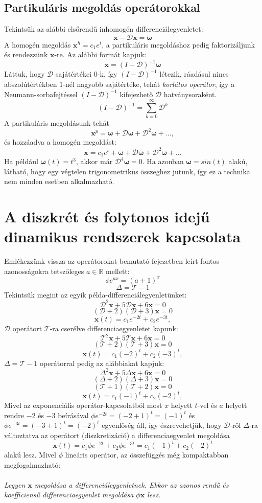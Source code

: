 \documentclass[14p]{article}
\begin{document}
\subsection{Partikuláris megoldás operátorokkal}
Tekintsük az alábbi elsőrendű inhomogén differenciálegyenletet:
\[
	\pmb{x} - \mathcal{D}\pmb{x} = \pmb{\omega}
\]
A homogén megoldás $\pmb{x}^h = c_1 e^{t}$, a partikuláris megoldáshoz pedig faktorizáljunk és rendezzünk $\pmb{x}$-re. Az alábbi formát kapjuk:
\[
	\pmb{x} = (I - \mathcal{D})^{-1}\pmb{\omega}
\]
Láttuk, hogy $\mathcal{D}$ sajátértékei 0-k, így $(I - \mathcal{D})^{-1}$ létezik, ráadásul nincs abszolútértékben $1$-nél nagyobb sajátértéke, tehát \emph{korlátos operátor}, így a Neumann-sorbafejtéssel $(I - \mathcal{D})^{-1}$ kifejezhető $\mathcal{D}$ hatványsoraként.
\[
	(I - \mathcal{D})^{-1} = \sum_{k=0}^{\infty}{\mathcal{D}^k}
\]
A partikuláris megoldásunk tehát
\[
	\pmb{x}^p = \pmb{\omega} + \mathcal{D}\pmb{\omega} + \mathcal{D}^2\pmb{\omega} + \dots,
\]
és hozzáadva a homogén megoldást:
\[
	\pmb{x} = c_1 e^{t} + \pmb{\omega} + \mathcal{D}\pmb{\omega} + \mathcal{D}^2\pmb{\omega} + \dots
\]
Ha például $\pmb{\omega}(t) = t^3$, akkor már $\mathcal{D}^4\pmb{\omega} = 0$. Ha azonban $\pmb{\omega} = sin(t)$ alakú, látható, hogy egy végtelen trigonometrikus összeghez jutunk, így ez a technika nem minden esetben alkalmazható.

\section{A diszkrét és folytonos idejű dinamikus rendszerek kapcsolata}
Emlékezzünk vissza az operátorokat bemutató fejezetben leírt fontos azonosságokra tetszőleges $a \in \mathbb{R}$ mellett:
\[
	\phi e^{ax} = (a+1)^x
\]
\[
	\Delta = \mathcal{T} - 1
\]
Tekintsük megint az egyik példa-differenciálegyenletünket:
\[
	\mathcal{D}^2\pmb{x} + 5\mathcal{D}\pmb{x} + 6\pmb{x} = 0
\]
\[
	(\mathcal{D} + 2)(\mathcal{D} + 3)\pmb{x} = 0
\]
\[
	\pmb{x}(t) = c_1 e^{-2t} + c_2 e^{-3t},
\]
$\mathcal{D}$ operátort $\mathcal{T}$-ra cserélve differenciaegyenletet kapunk:
\[
	\mathcal{T}^2\pmb{x} + 5\mathcal{T}\pmb{x} + 6\pmb{x} = 0
\]
\[
	(\mathcal{T} + 2)(\mathcal{T} + 3)\pmb{x} = 0
\]
\[
	\pmb{x}(t) = c_1 (-2)^t + c_2 (-3)^t,
\]
$\Delta = \mathcal{T} - 1$ operátorral pedig az alábbiakat kapjuk:
\[
	\Delta^2\pmb{x} + 5\Delta\pmb{x} + 6\pmb{x} = 0
\]
\[
	(\Delta + 2)(\Delta + 3)\pmb{x} = 0
\]
\[
	(\mathcal{T}+1)(\mathcal{T}+2)\pmb{x} = 0
\]
\[
	\pmb{x}(t) = c_1 (-1)^t + c_2 (-2)^t,	
\]
Mivel az exponenciális operátor-kapcsolatból most $x$ helyett $t$-vel és $a$ helyett rendre $-2$ és $-3$ beírásával $\phi e^{-2t} = (-2 + 1)^t = (-1)^t$ és $\phi e^{-3t} = (-3 + 1)^t = (-2)^t$ egyenlőség áll, így észrevehetjük, hogy $\mathcal{D}$-ről $\Delta$-ra változtatva az operátort (diszkretizáció) a differenciaegyenlet megoldása
\[
	\pmb{x}(t) = c_1 \phi e^{-2t} + c_2 \phi e^{-3t} = c_1 (-1)^t + c_2 (-2)^t
\] 
alakú lesz. Mivel $\phi$ lineáris operátor, az összefüggés még kompaktabban megfogalmazható:
\\
\\
\emph{Legyen $\pmb{x}$ megoldása a differenciálegyenletnek. Ekkor az azonos rendű és koefficiensű differenciaegyenlet megoldása $\phi \pmb{x}$ lesz.}
\end{document}
